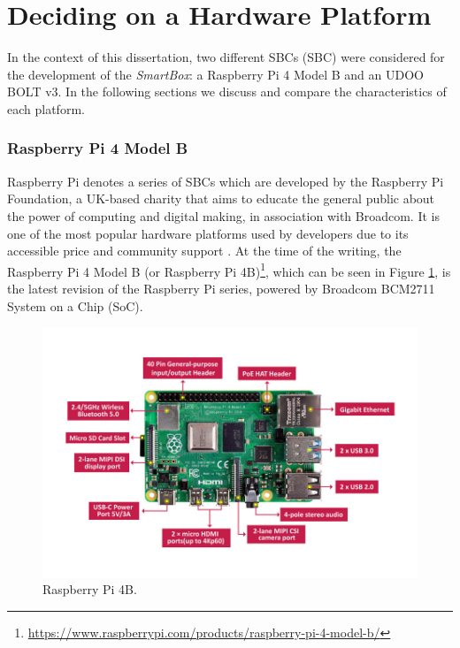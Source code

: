 \section{Deciding on a Hardware Platform}

In the context of this dissertation, two different \acl{SBC}s (\acs{SBC}) were considered for the development of the \textit{SmartBox}: a Raspberry Pi 4 Model B and an UDOO BOLT v3. In the following sections we discuss and compare the characteristics of each platform. 

\subsubsection{Raspberry Pi 4 Model B}

Raspberry Pi denotes a series of \acs{SBC}s which are developed by the Raspberry Pi Foundation, a UK-based charity that aims to educate the general public about the power of computing and digital making, in association with Broadcom. It is one of the most popular hardware platforms used by developers due to its accessible price and community support \cite{jain2021introduction}.
At the time of the writing, the Raspberry Pi 4 Model B (or Raspberry Pi 4B)\footnote{\url{https://www.raspberrypi.com/products/raspberry-pi-4-model-b/}}, which can be seen in Figure \ref{fig:raspberrypi-image}, is the latest revision of the Raspberry Pi series, powered by Broadcom BCM2711 System on a Chip (SoC).

\begin{figure}[H]
    \centering
    \includegraphics[width=\linewidth]{images/raspberry-4-modele-b-4go.jpg}
    \caption{Raspberry Pi 4B.}
    \label{fig:raspberrypi-image}
\end{figure}


